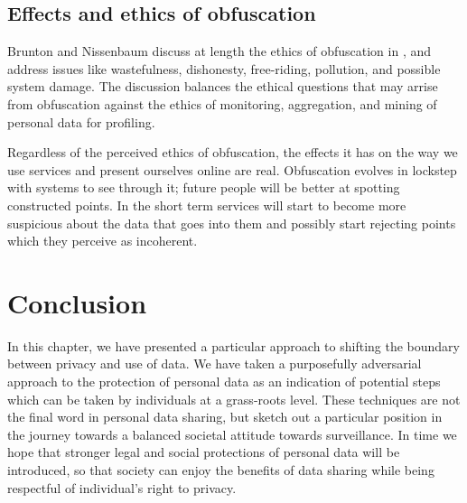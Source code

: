 \documentclass{IOS-Book-Article}     %
\newcommand{\tbox}[3][red]{{
\color{#1}\noindent{
   \fbox{\scriptsize{ {\bf #2} \textsl{#3}}}
   \vspace{2pt}
}
}}
\newcommand{\todo}[1]{\tbox{TODO:}{#1}}
\begin{document}
\subsection{Effects and ethics of obfuscation}
Brunton and Nissenbaum discuss at length the ethics of obfuscation in \cite{brunton2011vernacular}, and address issues like wastefulness, dishonesty, free-riding, pollution, and possible system damage. The discussion balances the ethical questions that may arrise from obfuscation against the ethics of monitoring, aggregation, and mining of personal data for profiling.

Regardless of the perceived ethics of obfuscation, the effects it has on the way we use services and present ourselves online are real. Obfuscation evolves in lockstep with systems to see through it; future people will be better at spotting constructed points. In the short term services will start to become more suspicious about the data that goes into them and possibly start rejecting points which they perceive as incoherent. 


\section{Conclusion}

In this chapter, we have presented a particular approach to shifting the
boundary between privacy and use of data. We have taken a purposefully
adversarial approach to the protection of personal data as an indication of
potential steps which can be taken by individuals at a grass-roots level. 
These techniques are not the final word in personal data sharing, but sketch out
a particular position in the journey towards a balanced societal attitude
towards surveillance.
In time we hope that stronger legal and social protections of personal data will be
introduced, so that society can enjoy the benefits of data sharing while being
respectful of individual's right to
privacy\cite{rooney2012OpenData,rauhofer2012FutureProofing}. 






\end{document}
